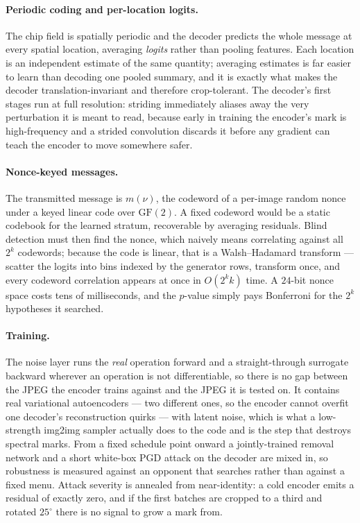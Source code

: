 \documentclass[10pt,twocolumn]{article}
\theoremstyle{definition}
\theoremstyle{remark}
\begin{document}
\paragraph{Periodic coding and per-location logits.} The chip field is spatially
periodic and the decoder predicts the whole message at every spatial location,
averaging \emph{logits} rather than pooling features. Each location is an
independent estimate of the same quantity; averaging estimates is far easier to
learn than decoding one pooled summary, and it is exactly what makes the decoder
translation-invariant and therefore crop-tolerant. The decoder's first stages run
at full resolution: striding immediately aliases away the very perturbation it is
meant to read, because early in training the encoder's mark is high-frequency and
a strided convolution discards it before any gradient can teach the encoder to
move somewhere safer.

\paragraph{Nonce-keyed messages.} The transmitted message is $m(\nu)$, the
codeword of a per-image random nonce under a keyed linear code over
$\mathrm{GF}(2)$. A fixed codeword would be a static codebook for the learned
stratum, recoverable by averaging residuals. Blind detection must then find the
nonce, which naively means correlating against all $2^{k}$ codewords; because the
code is linear, that is a Walsh--Hadamard transform --- scatter the logits into
bins indexed by the generator rows, transform once, and every codeword
correlation appears at once in $O(2^{k}k)$ time. A $24$-bit nonce space costs
tens of milliseconds, and the $p$-value simply pays Bonferroni for the $2^{k}$
hypotheses it searched.

\paragraph{Training.} The noise layer runs the \emph{real} operation forward and a
straight-through surrogate backward wherever an operation is not differentiable,
so there is no gap between the JPEG the encoder trains against and the JPEG it is
tested on. It contains real variational autoencoders --- two different ones, so
the encoder cannot overfit one decoder's reconstruction quirks --- with latent
noise, which is what a low-strength img2img sampler actually does to the code and
is the step that destroys spectral marks. From a fixed schedule point onward a
jointly-trained removal network and a short white-box PGD attack on the decoder
are mixed in, so robustness is measured against an opponent that searches rather
than against a fixed menu. Attack severity is annealed from near-identity: a cold
encoder emits a residual of exactly zero, and if the first batches are cropped to
a third and rotated $25^\circ$ there is no signal to grow a mark from.
\end{document}
